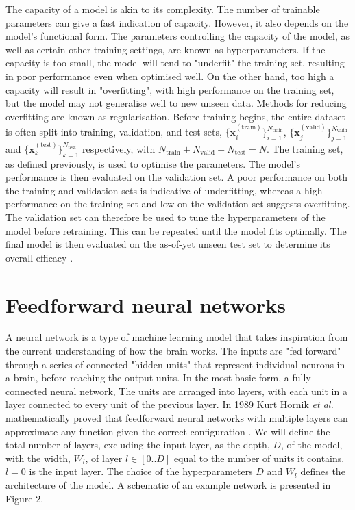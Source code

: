 \documentclass[12pt]{article}
\begin{document}
The capacity of a model is akin to its complexity. The number of trainable parameters can give a fast indication of capacity. However, it also depends on the model's functional form. The parameters controlling the capacity of the model, as well as certain other training settings, are known as hyperparameters. If the capacity is too small, the model will tend to "underfit" the training set, resulting in poor performance even when optimised well. On the other hand, too high a capacity will result in "overfitting", with high performance on the training set, but the model may not generalise well to new unseen data. Methods for reducing overfitting are known as regularisation. Before training begins, the entire dataset is often split into training, validation, and test sets, $\{\bm{x}_i^{(\textrm{train})}\}_{i=1}^{N_{\mathrm{train}}}$, $\{\bm{x}_j^{(\textrm{valid})}\}_{j=1}^{N_{\mathrm{valid}}}$ and $\{\bm{x}_k^{(\textrm{test})}\}_{k=1}^{N_{\mathrm{test}}}$ respectively, with $N_{\mathrm{train}}+N_{\mathrm{valid}}+N_{\mathrm{test}}=N$. The training set, as defined previously, is used to optimise the parameters. The model's performance is then evaluated on the validation set. A poor performance on both the training and validation sets is indicative of underfitting, whereas a high performance on the training set and low on the validation set suggests overfitting. The validation set can therefore be used to tune the hyperparameters of the model before retraining. This can be repeated until the model fits optimally. The final model is then evaluated on the as-of-yet unseen test set to determine its overall efficacy \cite{Goodfellow16}.
\section{Feedforward neural networks}
A neural network is a type of machine learning model that takes inspiration from the current understanding of how the brain works. The inputs are "fed forward" through a series of connected "hidden units" that represent individual neurons in a brain, before reaching the output units. In the most basic form, a fully connected neural network, The units are arranged into layers, with each unit in a layer connected to every unit of the previous layer. In 1989 Kurt Hornik \textit{et al.} mathematically proved that feedforward neural networks with multiple layers can approximate any function given the correct configuration \cite{Hornik89}. We will define the total number of layers, excluding the input layer, as the depth, $D$, of the model, with the width, $W_l$, of layer $l\in[0..D]$ equal to the number of units it contains. $l=0$ is the input layer. The choice of the hyperparameters $D$ and $W_l$ defines the architecture of the model. A schematic of an example network is presented in Figure 2. 
\end{document}
